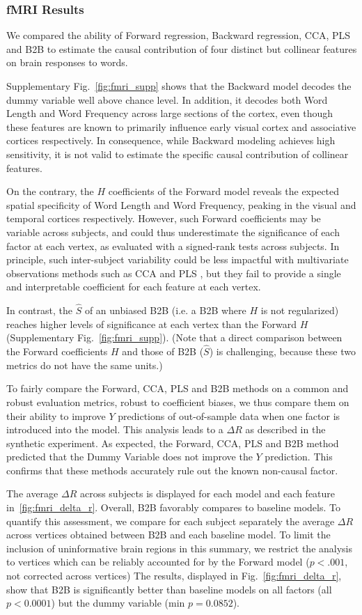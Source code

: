 \subsubsection{fMRI Results}
We compared the ability of Forward regression, Backward regression, CCA, PLS
and B2B to estimate the causal contribution of four distinct but collinear
features on brain responses to words.

Supplementary Fig.~\ref{fig:fmri_supp} shows that the Backward model decodes
the dummy variable well above chance level. In addition, it decodes both Word
Length and Word Frequency across large sections of the cortex, even though
these features are known to primarily influence early visual cortex and
associative cortices respectively. In consequence, while Backward
modeling achieves high sensitivity, it is not valid to estimate the specific
causal contribution of collinear features.

On the contrary, the $H$
coefficients of the Forward model reveals the expected spatial specificity of
Word Length and Word Frequency, peaking in the visual and temporal cortices
respectively. However, such Forward coefficients may be variable across
subjects, and could thus underestimate the significance of each factor at each
vertex, as evaluated with a  signed-rank tests across subjects. In principle, such
inter-subject variability could be less impactful with
multivariate observations methods such as CCA and PLS \citep{bilenko2016Pyrcca,
king2018encoding}, but they fail to provide a single and interpretable coefficient
for each feature at each vertex.

In contrast, the $\hat S$ of an unbiased B2B (i.e. a B2B where $H$ is not
regularized) reaches higher levels of significance at each vertex
than the Forward $H$ (Supplementary Fig.~\ref{fig:fmri_supp}). (Note that a direct
comparison between the Forward coefficients $H$ and those of B2B ($\hat S$)
is challenging, because these two metrics do not have the same units.)

To fairly compare the Forward, CCA, PLS and B2B methods on a common and robust
evaluation metrics, robust to coefficient biases, we thus compare them on their ability to improve $Y$
predictions of out-of-sample data when one factor is introduced into the model.
This analysis leads to a $\Delta R$ as described in the synthetic experiment.
As expected, the Forward, CCA, PLS
and B2B method predicted that the Dummy Variable does not improve the $Y$
prediction. This confirms that these methods accurately rule out the known
non-causal factor.

The average $\Delta R$ across subjects is displayed for each model and each
feature in~\ref{fig:fmri_delta_r}. Overall, B2B favorably compares to baseline models.
To quantify this assessment, we compare for each subject separately
the average $\Delta R$ across vertices obtained between B2B and each
baseline model. To limit the inclusion of uninformative brain regions in this
summary, we restrict the analysis to vertices which can be reliably accounted
for by the Forward model ($p<.001$, not corrected across vertices)
The results, displayed in Fig.~\ref{fig:fmri_delta_r}, show that B2B
is significantly better than baseline models on all factors (all $p<0.0001$)
but the dummy variable (min $p=0.0852$).
